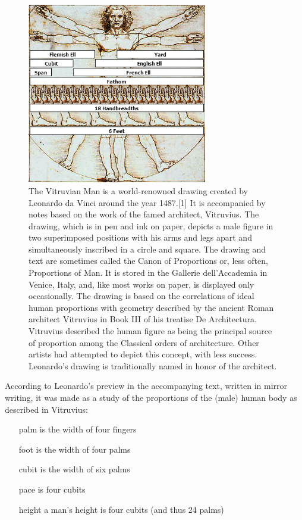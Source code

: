 \documentclass{tufte-book}
\begin{document}
\begin{figure}[htbp]
\centering
\includegraphics[width=0.7\textwidth]{./graphics/vitruvian-man}

\caption{The Vitruvian Man is a world-renowned drawing created by Leonardo da Vinci around the year 1487.[1] It is accompanied by notes based on the work of the famed architect, Vitruvius. The drawing, which is in pen and ink on paper, depicts a male figure in two superimposed positions with his arms and legs apart and simultaneously inscribed in a circle and square. The drawing and text are sometimes called the Canon of Proportions or, less often, Proportions of Man. It is stored in the Gallerie dell'Accademia in Venice, Italy, and, like most works on paper, is displayed only occasionally.
The drawing is based on the correlations of ideal human proportions with geometry described by the ancient Roman architect Vitruvius in Book III of his treatise De Architectura. Vitruvius described the human figure as being the principal source of proportion among the Classical orders of architecture. Other artists had attempted to depict this concept, with less success. Leonardo's drawing is traditionally named in honor of the architect.}

\end{figure}

According to Leonardo's preview in the accompanying text, written in mirror writing, it was made as a study of the proportions of the (male) human body as described in Vitruvius:

\begin{enumerate}
\item [palm] is the width of four fingers

\item [foot] is the width of four palms

\item [cubit] is the width of six palms

\item [pace] is four cubits

\item [height] a man's height is four cubits (and thus 24 palms)
\end{enumerate}
\end{document}
